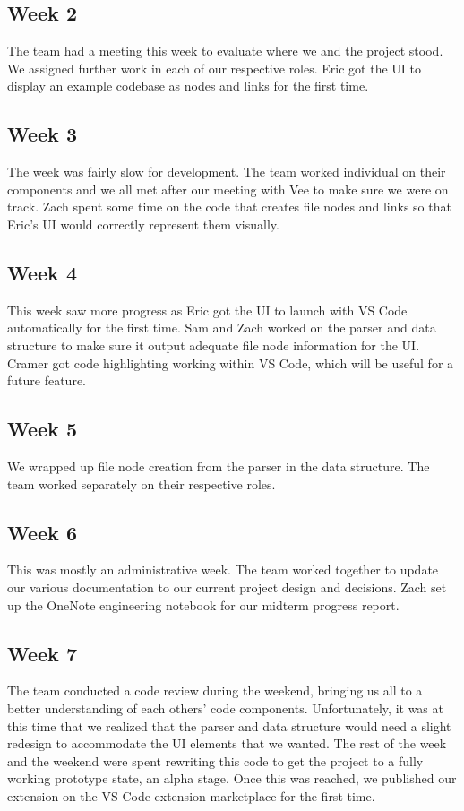 \documentclass[letterpaper,10pt,titlepage,draftclsnofoot,onecolumn,onesided] {IEEEtran}
\begin{document}
	\subsection{Week 2} 
	The team had a meeting this week to evaluate where we and the project stood. 
	We assigned further work in each of our respective roles. 
	Eric got the UI to display an example codebase as nodes and links for the first time.
	
	\subsection{Week 3} 
	The week was fairly slow for development. 
	The team worked individual on their components and we all met after our meeting with Vee to make sure we were on track. 
	Zach spent some time on the code that creates file nodes and links so that Eric’s UI would correctly represent them visually.
	
	\subsection{Week 4} 
	This week saw more progress as Eric got the UI to launch with VS Code automatically for the first time. 
	Sam and Zach worked on the parser and data structure to make sure it output adequate file node information for the UI. 
	Cramer got code highlighting working within VS Code, which will be useful for a future feature.
	
	\subsection{Week 5} 
	We wrapped up file node creation from the parser in the data structure. 
	The team worked separately on their respective roles.
	
	\subsection{Week 6} 
	This was mostly an administrative week. 
	The team worked together to update our various documentation to our current project design and decisions. 
	Zach set up the OneNote engineering notebook for our midterm progress report.
	\subsection{Week 7} 
	The team conducted a code review during the weekend, bringing us all to a better understanding of each others' code components. 
	Unfortunately, it was at this time that we realized that the parser and data structure would need a slight redesign to accommodate the UI elements that we wanted. 
	The rest of the week and the weekend were spent rewriting this code to get the project to a fully working prototype state, an alpha stage. 
	Once this was reached, we published our extension on the VS Code extension marketplace for the first time.
	
\end{document}
